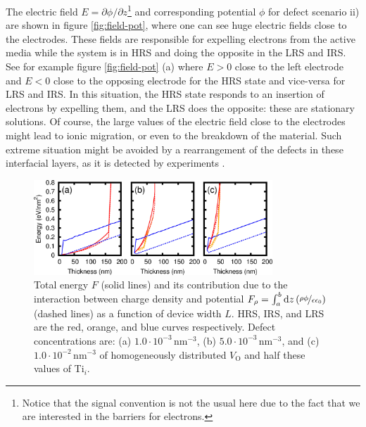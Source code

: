 The electric field $E = \partial \phi / \partial z$\footnote{Notice that the signal convention is not the usual here due to the fact that we are interested in the barriers for electrons.} and corresponding potential $\phi$ for defect scenario ii) are shown in figure \ref{fig:field-pot}, where one can see huge electric fields close to the electrodes. These fields are responsible for expelling electrons from the active media while the system is in HRS and doing the opposite in the LRS and IRS. See for example figure \ref{fig:field-pot} (a) where $E > 0$ close to the left electrode and $E < 0$ close to the opposing electrode for the HRS state and vice-versa for LRS and IRS. In this situation, the HRS state responds to an insertion of electrons by expelling them, and the LRS does the opposite: these are stationary solutions. Of course, the large values of the electric field close to the electrodes might lead to ionic migration, or even to the breakdown of the material. Such extreme situation might be avoided by a rearrangement of the defects in these interfacial layers, as it is detected by experiments \cite{Kwon2010,Szot2011,HwanKim2011}.
\begin{center}
  \begin{figure}[h!]
    \begin{center}
      \includegraphics[width=0.8\textwidth]{img/energy-width.jpg}    
      \caption{Total energy $F$ (solid lines) and its contribution due to the interaction between charge density and potential $F_{\rho} = \int_a^b \mathrm{d}z \left(\nicefrac{\rho \phi}{\epsilon \epsilon_0}\right)$ (dashed lines) as a function of device width $L$. HRS, IRS, and LRS are the red, orange, and blue curves respectively. Defect concentrations are: (a) $1.0 \cdot 10^{-3} \, \text{nm}^{-3}$, (b) $5.0 \cdot 10^{-3} \, \text{nm}^{-3}$, and (c) $1.0 \cdot 10^{-2} \, \text{nm}^{-3}$ of homogeneously distributed $V_{\text{O}}$ and half these values of Ti$_i$.} 
      \label{fig:fxl} 
    \end{center}
  \end{figure}
\end{center}

